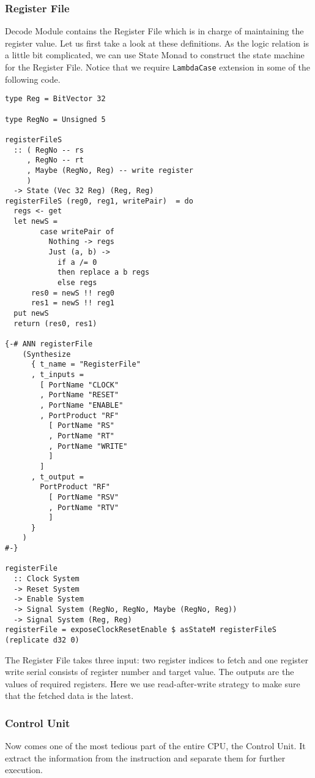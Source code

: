 \subsubsection{Register File}
Decode Module contains the Register File which is in charge of maintaining the register value. Let us first take a look at these definitions.
As the logic relation is a little bit complicated, we can use State Monad to construct the state machine for the Register File.
Notice that we require \texttt{LambdaCase} extension in some of the following code.
\begin{verbatim}
type Reg = BitVector 32

type RegNo = Unsigned 5

registerFileS 
  :: ( RegNo -- rs
     , RegNo -- rt
     , Maybe (RegNo, Reg) -- write register
     )
  -> State (Vec 32 Reg) (Reg, Reg)
registerFileS (reg0, reg1, writePair)  = do
  regs <- get
  let newS =
        case writePair of
          Nothing -> regs
          Just (a, b) ->
            if a /= 0
            then replace a b regs
            else regs
      res0 = newS !! reg0
      res1 = newS !! reg1
  put newS
  return (res0, res1)

{-# ANN registerFile
    (Synthesize
      { t_name = "RegisterFile"
      , t_inputs =
        [ PortName "CLOCK"
        , PortName "RESET"
        , PortName "ENABLE"
        , PortProduct "RF" 
          [ PortName "RS"
          , PortName "RT"
          , PortName "WRITE"
          ]
        ]
      , t_output = 
        PortProduct "RF" 
          [ PortName "RSV"
          , PortName "RTV"
          ]
      }
    )
#-}

registerFile 
  :: Clock System
  -> Reset System
  -> Enable System
  -> Signal System (RegNo, RegNo, Maybe (RegNo, Reg))
  -> Signal System (Reg, Reg)
registerFile = exposeClockResetEnable $ asStateM registerFileS (replicate d32 0)
\end{verbatim}
The Register File takes three input: two register indices to fetch and one register write serial consists of register number and target value. The outputs are the values of required registers. Here we use read-after-write strategy to make sure that the fetched data is the latest.

\subsubsection{Control Unit}
Now comes one of the most tedious part of the entire CPU, the Control Unit. It extract the information from the instruction and separate them for further execution.

